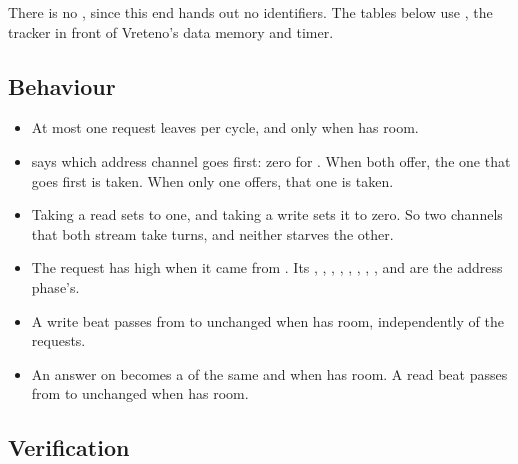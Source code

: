 There is no , since this end hands out no identifiers. The
tables below use , the tracker in front of
Vreteno's data memory and timer.


\subsection*{Behaviour}

\begin{itemize}
\item At most one request leaves per cycle, and only when 
has room.
\item {} says which address channel goes first: zero for
. When both offer, the one that goes first is taken. When
only one offers, that one is taken.
\item Taking a read sets  to one, and taking a write sets it
to zero. So two channels that both stream take turns, and neither
starves the other.
\item The request has  high when it came from .
Its , , , , ,
, , ,  and 
are the address phase's.
\item A write beat passes from  to  unchanged when
 has room, independently of the requests.
\item An answer on  becomes a  of the same 
and  when  has room. A read beat passes from
 to  unchanged when  has room.
\end{itemize}

\subsection*{Verification}

